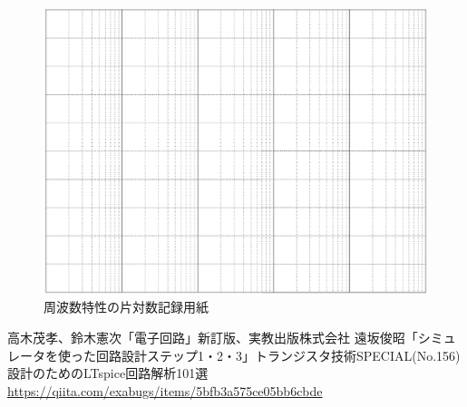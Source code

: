 \documentclass[uplatex,a4paper,11pt,oneside,openany]{jsbook}
\begin{document}
\begin{figure}[H]
	\centering
	\includegraphics[keepaspectratio, scale=0.76, angle=90]
	{figs/eps/logscale.eps}
	\caption{周波数特性の片対数記録用紙}
	\label{fig:23}
\end{figure}
%
%
\appendix
%
\begin{thebibliography}{99}
 高木茂孝、鈴木憲次「電子回路」新訂版、実教出版株式会社
 遠坂俊昭「シミュレータを使った回路設計ステップ1・2・3」トランジスタ技術SPECIAL(No.156)設計のためのLTspice回路解析101選
 \url{https://qiita.com/exabugs/items/5bfb3a575ce05bb6cbde}
\end{thebibliography}
%
\end{document}

